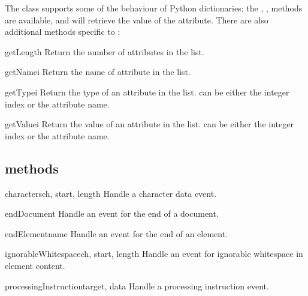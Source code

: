 \documentclass{howto}
\newcommand{\attribute}[1]{\code{#1}}
\begin{document}
The  class supports some of the behaviour of
Python dictionaries; the , ,
 methods are available, and  will
retrieve the value of the \attribute{href} attribute.  There are also
additional methods specific to :

\begin{methoddesc}{getLength}{}
Return the number of attributes in the list.
\end{methoddesc}

\begin{methoddesc}{getName}{i}
Return the name of attribute  in the list.
\end{methoddesc}

\begin{methoddesc}{getType}{i}
Return the type of an attribute in the list.  can be
either the integer index or the attribute name.
\end{methoddesc}

\begin{methoddesc}{getValue}{i}
Return the value of an attribute in the list.  can be
either the integer index or the attribute name.
\end{methoddesc}

\subsection{ methods}

\begin{methoddesc}{characters}{ch, start, length}
Handle a character data event.
\end{methoddesc}

\begin{methoddesc}{endDocument}{}
Handle an event for the end of a document.
\end{methoddesc}

\begin{methoddesc}{endElement}{name}
Handle an event for the end of an element.
\end{methoddesc}

\begin{methoddesc}{ignorableWhitespace}{ch, start, length}
Handle an event for ignorable whitespace in element content.
\end{methoddesc}

\begin{methoddesc}{processingInstruction}{target, data}
Handle a processing instruction event.
\end{methoddesc}
\end{document}

